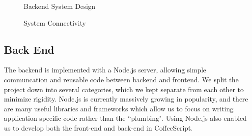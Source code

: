 \documentclass[11pt]{article}
\begin{document}
\begin{figure}[H]
\centering
{}
\caption{\label{fig:backend-diagram} Backend System Design}
\end{figure}
\begin{figure}[H]
\centering
{}
\caption{\label{fig:system-connectivity} System Connectivity}
\end{figure}


\subsection {Back End}

The backend is implemented with a Node.js server, allowing simple communcation and reusable code between backend and frontend. We split the project down into several categories, which we kept separate from each other to minimize rigidity. Node.js is currently massively growing in popularity, and there are many useful libraries and frameworks which allow us to focus on writing application-specific code rather than the ``plumbing". Using Node.js also enabled us to develop both the front-end and back-end in CoffeeScript.
\end{document}
